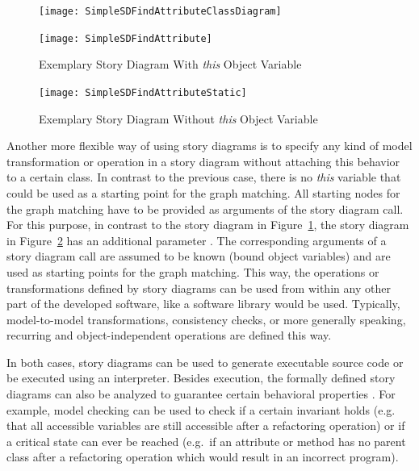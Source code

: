 \begin{figure}[tb]
	\centering
  \begin{minipage}[t]{.4\textwidth}
    \centering
    \texttt{[image: SimpleSDFindAttributeClassDiagram]} 
    \caption{Type Model for the Story Diagram in Figure~\ref{fig:SDWithThis}}
    \label{fig:SDWithThisClassDiagram}
  \end{minipage}%
  \hfill
  \begin{minipage}[t]{.55\textwidth}
    \centering
    \texttt{[image: SimpleSDFindAttribute]}
    \caption{Exemplary Story Diagram With \emph{this} Object Variable}
    \label{fig:SDWithThis}
  \end{minipage}
\end{figure}

\begin{figure}[tb]
	\centering
  \texttt{[image: SimpleSDFindAttributeStatic]} 
  \caption{Exemplary Story Diagram Without \emph{this} Object Variable}
  \label{fig:SDWithThisStatic}
\end{figure}

Another more flexible way of using story diagrams is to specify any kind of model transformation or operation in a story diagram without attaching this behavior to a certain class.
In contrast to the previous case, there is no \emph{this} variable that could be used as a starting point for the graph matching.
All starting nodes for the graph matching have to be provided as arguments of the story diagram call.
For this purpose, in contrast to the story diagram in Figure~\ref{fig:SDWithThis}, the story diagram in Figure~\ref{fig:SDWithThisStatic} has an additional parameter .
The corresponding arguments of a story diagram call are assumed to be known (bound object variables) and are used as starting points for the graph matching.
This way, the operations or transformations defined by story diagrams can be used from within any other part of the developed software, like a software library would be used.
Typically, model-to-model transformations, consistency checks, or more generally speaking, recurring and object-independent operations are defined this way.


In both cases, story diagrams can be used to generate executable source code or be executed using an interpreter.
Besides execution, the formally defined story diagrams can also be analyzed to guarantee certain behavioral properties \cite{Mey09,Zue09}.
For example, model checking can be used to check if a certain invariant holds
(e.g.\, that all accessible variables are still accessible after a refactoring operation)
or if a critical state can ever be reached (e.g.\, if an attribute or method has no parent class after a refactoring operation which would result in an incorrect program).

